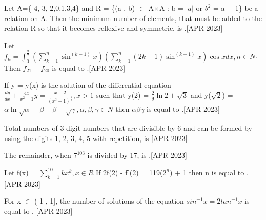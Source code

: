 \iffalse
  \title{Assignment}
  \author{ee24btech11030}
  \section{mcq-single}
\fi

 \item Let A=\{-4,-3,-2,0,1,3,4\} and R = \{(a , b) $\in$ A$\times$A : b = $|a|$ or $b^2$ = a + 1\} be a relation on A. Then the minimum number of elements, that must be added to the relation R so that it becomes reflexive and symmetric, is  \underline{\hspace{1cm}}.\hfill{[APR 2023]}
    \bigskip
    
    \item Let $f_n = \int_{0}^{\frac{\pi}{2}}\left(\sum_{k=1}^{n}\sin^{(k - 1)}{x}\right)\left(\sum_{k=1}^{n}(2k - 1)\sin^{(k - 1)}{x}\right)\cos{x}dx , n \in N$. Then $f_{21} - f_{20}$ is equal to \underline{\hspace{1cm}}.\hfill{[APR 2023]}
    \bigskip
    
    \item If y = y(x) is the solution of the differential equation 
    $\frac{dy}{dx} + \frac{4x}{x^2 - 1}y = \frac{x + 2}{(x^2 - 1)^{\frac{5}{2}}} , x > 1$ such that y(2) = $\frac{2}{9}\ln{2 + \sqrt{3}}$ and y($\sqrt{2}$) = $\alpha\ln{\sqrt{\alpha} + \beta} + \beta - \sqrt{\gamma} , \alpha,\beta,\gamma \in N$ then $\alpha\beta\gamma$ is equal to \underline{\hspace{1cm}}.\hfill{[APR 2023]}
    \bigskip
    
    \item Total numbers of 3-digit numbers that are divisible by 6 and can be formed by using the digits 1, 2, 3, 4, 5 with repetition, is \underline{\hspace{1cm}}\hfill{[APR 2023]}
    \bigskip
    
    \item The remainder, when $7^{103}$ is divided by 17, is \underline{\hspace{1cm}}.\hfill{[APR 2023]}
    \bigskip
    
    \item Let f(x) = $\sum_{k=1}^{10}kx^k , x \in R $ If 2f(2) - f'(2) = 119($2^n$) + 1 then n is equal to \underline{\hspace{1cm}}. \hfill{[APR 2023]}
    \bigskip
    
    \item For x $\in$ (-1 , 1], the number of solutions of the equation $sin^{-1}{x} = 2 tan^{-1}{x}$ is equal to \underline{\hspace{1cm}}. \hfill{[APR 2023]}
    \bigskip
    
